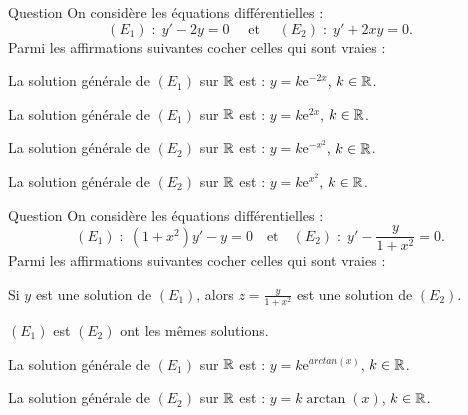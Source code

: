 

\begin{multi}[multiple,feedback=
{Une primitive de \(-2\) est \(-2x\), donc la solution générale de \((E_1)\) sur \(\Rr\) est :
\[y=k\mathrm{e}^{2x},\quad k\in \Rr.\]
Une primitive de \(2x\) est \(x^2\), donc la solution générale de \((E_2)\) sur \(\Rr\) est :
\[y=k\mathrm{e}^{-x^2},\quad k\in \Rr.\]
}]{Question}
On considère les équations différentielles : 
\[(E_1)\; :\; y'-2y=0\quad \mbox{ et }\quad (E_2)\; :\; y'+2xy=0.\]
Parmi les affirmations suivantes cocher celles qui sont vraies :

    \item La solution générale de \((E_1)\) sur \(\Rr\) est : \(\displaystyle y=k\mathrm{e}^{-2x}\), \(k\in \Rr\).
    \item* La solution générale de \((E_1)\) sur \(\Rr\) est : \(\displaystyle y=k\mathrm{e}^{2x}\), \(k\in \Rr\).
    \item* La solution générale de \((E_2)\) sur \(\Rr\) est : \(\displaystyle y=k\mathrm{e}^{-x^2}\), \(k\in \Rr\).
    \item La solution générale de \((E_2)\) sur \(\Rr\) est : \(\displaystyle y=k\mathrm{e}^{x^2}\), \(k\in \Rr\).
\end{multi}


\begin{multi}[multiple,feedback=
{En divisant \((E_1)\) par \(1+x^2\), on obtient \((E_2)\) : \((E_1)\) et \((E_2)\) ont les mêmes solutions. Une primitive de \(\displaystyle \frac{-1}{1+x^2}\) est \(-\arctan x\), donc la solution générale de \((E_1)\) sur \(\Rr\) est : \(y=k\mathrm{e}^{arctan (x)}\), \(k\in \Rr\).
}]{Question}
On considère les équations différentielles :
\[(E_1)\; :\; (1+x^2)y'-y=0\quad\mbox{et}\quad (E_2)\; :\; y'-\frac{y}{1+x^2}=0.\]
Parmi les affirmations suivantes cocher celles qui sont vraies :

    \item Si \(y\) est une solution de \((E_1)\), alors \(\displaystyle z=\frac{y}{1+x^2}\) est une solution de \((E_2)\).
    \item* \((E_1)\) est \((E_2)\) ont les mêmes solutions.
    \item* La solution générale de \((E_1)\) sur \(\Rr\) est : \(\displaystyle y=k\mathrm{e}^{arctan (x)}\), \(k\in \Rr\).
    \item La solution générale de \((E_2)\) sur \(\Rr\) est : \(\displaystyle y=k\arctan (x)\), \(k\in \Rr\).
\end{multi}


